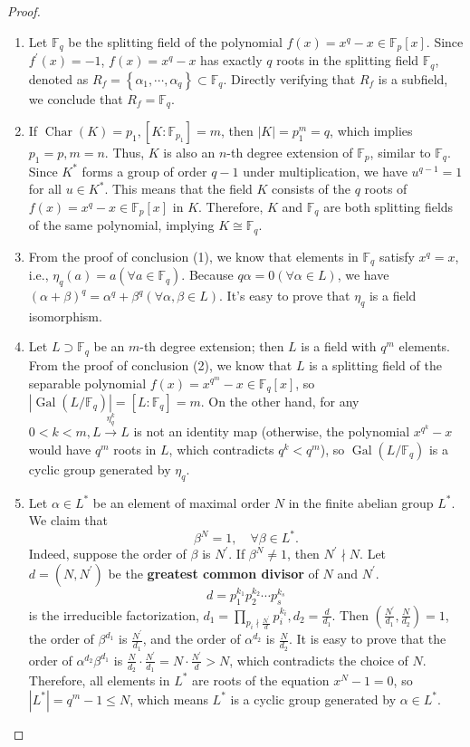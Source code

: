 \begin{proof}

\begin{enumerate}
	\item Let $\mathbb{F}_q$ be the splitting field of the polynomial $f(x)=x^q-x \in \mathbb{F}_p[x]$. Since $f^{\prime}(x)=-1$, $f(x)=x^q-x$ has exactly $q$ roots in the splitting field $\mathbb{F}_q$, denoted as $R_f=\left\{\alpha_1, \cdots, \alpha_q\right\} \subset \mathbb{F}_q$. Directly verifying that $R_f$ is a subfield, we conclude that $R_f=\mathbb{F}_q$.
	\item If $\operatorname{Char}(K)=p_1,\left[K: \mathbb{F}_{p_1}\right]=m$, then $|K|=p_1^m=q$, which implies $p_1=p, m=n$. Thus, $K$ is also an $n$-th degree extension of $\mathbb{F}_p$, similar to $\mathbb{F}_q$. Since $K^*$ forms a group of order $q-1$ under multiplication, we have $u^{q-1}=1$ for all $u \in K^*$. This means that the field $K$ consists of the $q$ roots of $f(x)=x^q-x \in \mathbb{F}_p[x]$ in $K$. Therefore, $K$ and $\mathbb{F}_q$ are both splitting fields of the same polynomial, implying $K \cong \mathbb{F}_q$.
	\item From the proof of conclusion (1), we know that elements in $\mathbb{F}_q$ satisfy $x^q=x$, i.e., $\eta_q(a)=a\left(\forall a \in \mathbb{F}_q\right)$. Because $q \alpha=0(\forall \alpha \in L)$, we have $(\alpha+\beta)^q=\alpha^q+\beta^q(\forall \alpha, \beta \in L)$. It's easy to prove that $\eta_q$ is a field isomorphism.
	\item Let $L \supset \mathbb{F}_q$ be an $m$-th degree extension; then $L$ is a field with $q^m$ elements. From the proof of conclusion (2), we know that $L$ is a splitting field of the separable polynomial $f(x)=x^{q^m}-x \in \mathbb{F}_q[x]$, so $\left|\operatorname{Gal}\left(L / \mathbb{F}_q\right)\right|=\left[L: \mathbb{F}_q\right]=m$. On the other hand, for any $0<k<m, L \xrightarrow{\eta_q^k} L$ is not an identity map (otherwise, the polynomial $x^{q^k}-x$ would have $q^m$ roots in $L$, which contradicts $q^k<q^m$), so $\operatorname{Gal}\left(L / \mathbb{F}_q\right)$ is a cyclic group generated by $\eta_q$.
	\item Let $\alpha \in L^*$ be an element of maximal order $N$ in the finite abelian group $L^*$. We claim that
\[
\beta^N=1, \quad \forall \beta \in L^* .
\]Indeed, suppose the order of $\beta$ is $N^{\prime}$. If $\beta^N \neq 1$, then $N^{\prime} \nmid  N$. Let $d=\left(N, N^{\prime}\right)$ be the \textbf{greatest common divisor} of $N$ and $N^{\prime}$.
\[
d=p_1^{k_1} p_2^{k_2} \cdots p_s^{k_s}
\]is the irreducible factorization, $d_1=\prod_{p_i \nmid  \frac{N^{\prime}}{d}} p_i^{k_i}, d_2=\frac{d}{d_1}$. Then $\left(\frac{N^{\prime}}{d_1}, \frac{N}{d_2}\right)=1$, the order of $\beta^{d_1}$ is $\frac{N^{\prime}}{d_1}$, and the order of $\alpha^{d_2}$ is $\frac{N}{d_2}$. It is easy to prove that the order of $\alpha^{d_2} \beta^{d_1}$ is $\frac{N}{d_2} \cdot \frac{N^{\prime}}{d_1}=N \cdot \frac{N^{\prime}}{d}>N$, which contradicts the choice of $N$. Therefore, all elements in $L^*$ are roots of the equation $x^N-1=0$, so $\left|L^*\right|=q^m-1 \leq N$, which means $L^*$ is a cyclic group generated by $\alpha \in L^*$.
\end{enumerate}


\end{proof}
